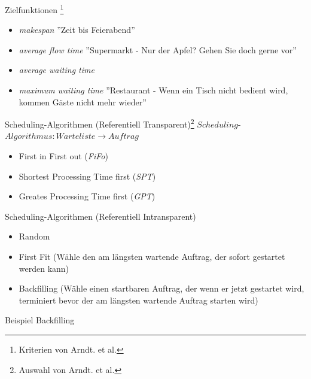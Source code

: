 \documentclass[aspectratio=169,10pt]{beamer}
\begin{document}
\begin{frame}[t,fragile]{Zielfunktionen \footnote{Kriterien von Arndt. et al.}}
\begin{itemize}[<+->]
	\item \emph{makespan} ''Zeit bis Feierabend''
	\item \emph{average flow time} ''Supermarkt - Nur der Apfel? Gehen Sie doch gerne vor''
	\item \emph{average waiting time} 	
	\item \emph{maximum waiting time} ''Restaurant - Wenn ein Tisch nicht bedient wird, kommen G\"aste nicht mehr wieder''
\end{itemize}
\end{frame}

\begin{frame}[t, fragile]{Scheduling-Algorithmen (Referentiell Transparent)\footnote{Auswahl von Arndt. et al.}} 
$Scheduling$-$Algorithmus : Warteliste \rightarrow Auftrag$\\
\pause

\begin{itemize}[<+->]
	\item First in First out (\emph{FiFo})
	\item Shortest Processing Time first (\emph{SPT})
	\item Greates Processing Time first (\emph{GPT})
\end{itemize}
\end{frame}





\begin{frame}[t, fragile]{Scheduling-Algorithmen (Referentiell Intransparent)}
\begin{itemize}[<+->]
	\item Random
	\item \alert{First Fit} (W\"ahle den am l\"angsten wartende Auftrag, der sofort gestartet werden kann)
	\item \alert{Backfilling} (W\"ahle einen startbaren Auftrag, der wenn er jetzt gestartet wird, terminiert bevor der am l\"angsten wartende Auftrag starten wird)
\end{itemize}
\end{frame}

\begin{frame}[t, fragile]{Beispiel Backfilling}
\end{frame}

\end{document}
